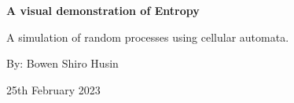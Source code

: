 \begin{titlepage}
    \begin{center} 
       \vspace*{1cm}
       
       \textbf{ \LARGE A visual demonstration of Entropy}

       \vspace{6.5cm}
       \large{A simulation of random processes using cellular automata}.


       \vspace{7.0cm}
       \large{By: Bowen Shiro Husin} \par
       
       \vspace{0.3cm}
       25th February 2023

    
        
    \end{center}
\end{titlepage}